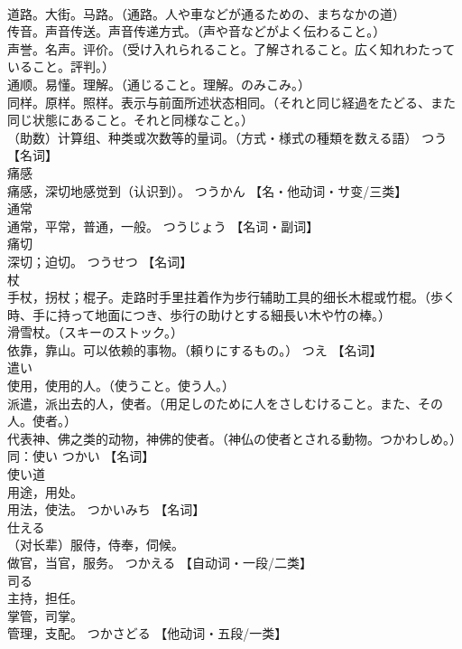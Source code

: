 \documentclass[8pt]{extreport}
\begin{document}
\begin{CJK}{UTF8}{min}
\\	道路。大街。马路。（通路。人や車などが通るための、まちなかの道） 
\\	传音。声音传送。声音传递方式。（声や音などがよく伝わること。） 
\\	声誉。名声。评价。（受け入れられること。了解されること。広く知れわたっていること。評判。） 
\\	通顺。易懂。理解。（通じること。理解。のみこみ。） 
\\	同样。原样。照样。表示与前面所述状态相同。（それと同じ経過をたどる、また同じ状態にあること。それと同様なこと。） 
\\	（助数）计算组、种类或次数等的量词。（方式・様式の種類を数える語）	つう		【名词】
\\	痛感	
\\	痛感，深切地感觉到（认识到）。	つうかん		【名・他动词・サ变/三类】
\\	通常	
\\	通常，平常，普通，一般。	つうじょう		【名词・副词】
\\	痛切	
\\	深切；迫切。	つうせつ		【名词】
\\	杖	
\\	手杖，拐杖；棍子。走路时手里拄着作为步行辅助工具的细长木棍或竹棍。（歩く時、手に持って地面につき、歩行の助けとする細長い木や竹の棒。） 
\\	滑雪杖。（スキーのストック。） 
\\	依靠，靠山。可以依赖的事物。（頼りにするもの。）	つえ		【名词】
\\	遣い	
\\	使用，使用的人。（使うこと。使う人。） 
\\	派遣，派出去的人，使者。（用足しのために人をさしむけること。また、その人。使者。） 
\\	代表神、佛之类的动物，神佛的使者。（神仏の使者とされる動物。つかわしめ。） 
\\	同：使い	つかい		【名词】
\\	使い道	
\\	用途，用处。 
\\	用法，使法。	つかいみち		【名词】
\\	仕える	
\\	（对长辈）服侍，侍奉，伺候。 
\\	做官，当官，服务。	つかえる		【自动词・一段/二类】
\\	司る	
\\	主持，担任。 
\\	掌管，司掌。 
\\	管理，支配。	つかさどる		【他动词・五段/一类】

\end{CJK}
\end{document}
